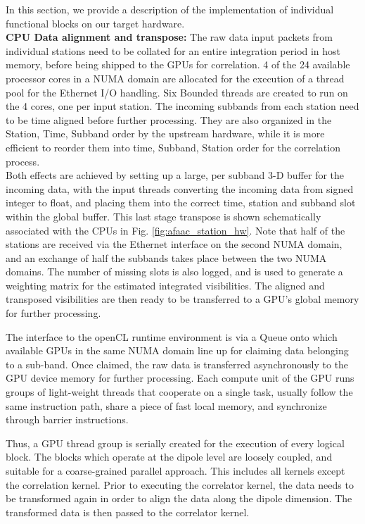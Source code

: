\documentclass{ws-jai}
\begin{document}
In this  section, we provide a  description of the implementation  of individual
functional blocks on our target hardware.\\
\noindent \textbf {CPU Data alignment and transpose:} The raw data input packets
from individual stations need to be collated for an entire integration period in
host memory,  before being  shipped to the  GPUs for correlation.   4 of  the 24
available processor cores in a NUMA domain  are allocated for the execution of a
thread pool  for the Ethernet I/O  handling. Six Bounded threads  are created to
run on  the 4  cores, one per  input station.  The  incoming subbands  from each
station  need to  be  time aligned  before further  processing.   They are  also
organized in the {Station, Time, Subband}  order by the upstream hardware, while
it is more efficient to reorder them into {time, Subband, Station} order for the
correlation process.\\  Both effects  are achieved  by setting  up a  large, per
subband 3-D buffer for the incoming  data, with the input threads converting the
incoming data  from signed integer to  float, and placing them  into the correct
time,  station and  subband  slot within  the global  buffer.   This last  stage
transpose    is   shown    schematically   associated    with   the    CPUs   in
Fig. \ref{fig:afaac_station_hw}.   Note that half  of the stations  are received
via the Ethernet  interface on the second  NUMA domain, and an  exchange of half
the subbands  takes place between  the two NUMA  domains. The number  of missing
slots  is also  logged, and  is  used to  generate  a weighting  matrix for  the
estimated integrated  visibilities. The aligned and  transposed visibilities are
then ready to be transferred to a GPU's global memory for further processing.

The  interface to  the openCL  runtime  environment is  via a  Queue onto  which
available GPUs in the same NUMA domain  line up for claiming data belonging to a
sub-band.  Once claimed,  the raw data is transferred asynchronously  to the GPU
device memory for  further processing. Each compute unit of  the GPU runs groups
of light-weight threads that cooperate on a single task, usually follow the same
instruction path,  share a piece of  fast local memory, and  synchronize through
barrier instructions.

Thus, a GPU thread group is serially  created for the execution of every logical
block.  The  blocks which operate at  the dipole level are  loosely coupled, and
suitable  for a  coarse-grained parallel  approach.  This  includes all  kernels
except the  correlation kernel.  Prior to executing  the correlator  kernel, the
data needs to be  transformed again in order to align the  data along the dipole
dimension. The transformed data is then passed to the correlator kernel.
\end{document}
